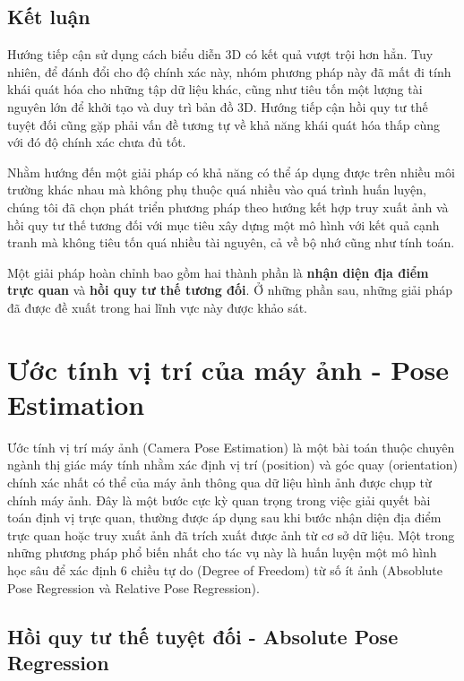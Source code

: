 \subsection{Kết luận}
Hướng tiếp cận sử dụng cách biểu diễn 3D có kết quả vượt trội hơn hẳn. Tuy nhiên, để đánh đổi cho độ chính xác này, nhóm phương pháp này đã mất đi tính khái quát hóa cho những tập dữ liệu khác, cũng như tiêu tốn một lượng tài nguyên lớn để khởi tạo và duy trì bản đồ 3D. Hướng tiếp cận hồi quy tư thế tuyệt đối cũng gặp phải vấn đề tương tự về khả năng khái quát hóa thấp cùng với đó độ chính xác chưa đủ tốt.

Nhằm hướng đến một giải pháp có khả năng có thể áp dụng được trên nhiều môi trường khác nhau mà không phụ thuộc quá nhiều vào quá trình huấn luyện, chúng tôi đã chọn phát triển phương pháp theo hướng kết hợp truy xuất ảnh và hồi quy tư thế tương đối với mục tiêu xây dựng một mô hình với kết quả cạnh tranh mà không tiêu tốn quá nhiều tài nguyên, cả về bộ nhớ cũng như tính toán.

Một giải pháp hoàn chỉnh bao gồm hai thành phần là \textbf{nhận diện địa điểm trực quan} và \textbf{hồi quy tư thế tương đối}. Ở những phần sau, những giải pháp đã được đề xuất trong hai lĩnh vực này được khảo sát.




\section{Ước tính vị trí của máy ảnh - Pose Estimation}

Ước tính vị trí máy ảnh (Camera Pose Estimation) là một bài toán thuộc chuyên ngành thị giác máy tính nhằm xác định vị trí (position) và góc quay (orientation) chính xác nhất có thể của máy ảnh thông qua dữ liệu hình ảnh được chụp từ chính máy ảnh. Đây là một bước cực kỳ quan trọng trong việc giải quyết bài toán định vị trực quan, thường được áp dụng sau khi bước nhận diện địa điểm trực quan hoặc truy xuất ảnh đã trích xuất được ảnh từ cơ sở dữ liệu. Một trong những phương pháp phổ biến nhất cho tác vụ này là huấn luyện một mô hình học sâu để xác định 6 chiều tự do (Degree of Freedom) từ số ít ảnh (Absoblute Pose Regression và Relative Pose Regression).

\subsection{Hồi quy tư thế tuyệt đối - Absolute Pose Regression}

